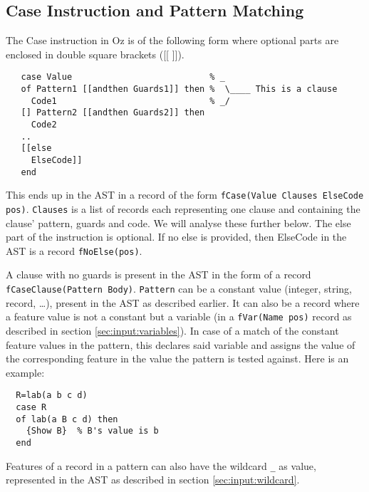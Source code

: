 \documentclass[a4paper]{memoir}
\begin{document}
\subsection{Case Instruction and Pattern Matching}\label{sec:input:patternmatching}
The Case instruction in Oz is of the following form where optional parts are enclosed in double square brackets ([[ ]]).
\begin{lstlisting}
   case Value                           % _
   of Pattern1 [[andthen Guards1]] then %  \____ This is a clause
     Code1                              % _/
   [] Pattern2 [[andthen Guards2]] then
     Code2
   ..
   [[else
     ElseCode]]
   end
\end{lstlisting}
This ends up in the AST in a record of the form \lstinline!fCase(Value Clauses ElseCode pos)!.
\lstinline!Clauses! is a list of records each representing one clause and containing the clause' pattern, guards and code. We will analyse these further below.
The else part of the instruction is optional. If no else is provided, then ElseCode in the AST is a record \lstinline!fNoElse(pos)!.

A clause with no guards is present in the AST in the form of a record \lstinline!fCaseClause(Pattern Body)!. \lstinline!Pattern! can be a constant value (integer, string, record, \ldots), present in the AST as described earlier. It can also be a record where a feature value is not a constant but a variable (in a \lstinline!fVar(Name pos)! record as described in section \ref{sec:input:variables}). In case of a match of the constant feature values in the pattern, this declares said variable and assigns the value of the corresponding feature in the value the pattern is tested against. Here is an example:
\begin{lstlisting}
  R=lab(a b c d)
  case R
  of lab(a B c d) then
    {Show B}  % B's value is b
  end
\end{lstlisting}
Features of a record in a pattern can also have the wildcard \lstinline!_! as value, represented in the AST as described in section \ref{sec:input:wildcard}.
\end{document}

